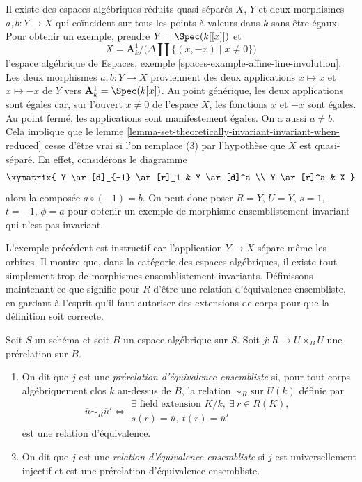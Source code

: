 \begin{example}
\label{example-not-invariant}
Il existe des espaces algébriques réduits quasi-séparés $X$, $Y$ et deux
morphismes $a, b : Y \to X$ qui coïncident sur tous les points à valeurs dans $k$ sans être
égaux. Pour obtenir un exemple, prendre $Y = \Spec(k[[x]])$ et
$$
X = \mathbf{A}^1_k \Big/ \big(\Delta \amalg \{(x, -x) \mid x \not = 0\}\big)
$$
l'espace algébrique de
Espaces, exemple \ref{spaces-example-affine-line-involution}.
Les deux morphismes $a, b : Y \to X$
proviennent des deux applications $x \mapsto x$ et $x \mapsto -x$
de $Y$ vers $\mathbf{A}^1_k = \Spec(k[x])$. Au point générique,
les deux applications sont égales car, sur l'ouvert $x \not = 0$ de l'espace
$X$, les fonctions $x$ et $-x$ sont égales. Au point fermé,
les applications sont manifestement égales. On a aussi $a \not = b$.
Cela implique que le
lemme \ref{lemma-set-theoretically-invariant-invariant-when-reduced}
cesse d'être vrai si l'on remplace (3) par l'hypothèse que $X$
est quasi-séparé. En effet, considérons le diagramme
$$
\xymatrix{
Y \ar[d]_{-1} \ar[r]_1 & Y \ar[d]^a \\
Y \ar[r]^a & X
}
$$
alors la composée $a \circ (-1) = b$. On peut donc poser $R = Y$,
$U = Y$, $s = 1$, $t = -1$, $\phi = a$ pour obtenir un exemple de morphisme
ensemblistement invariant qui n'est pas invariant.
\end{example}

\noindent
L'exemple précédent est instructif car l'application $Y \to X$ sépare même
les orbites. Il montre que, dans la catégorie des espaces algébriques, il existe tout
simplement trop de morphismes ensemblistement invariants. Définissons maintenant
ce que signifie pour $R$ d'être une relation d'équivalence ensembliste, en gardant
à l'esprit qu'il faut autoriser des extensions de corps pour que la définition
soit correcte.

\begin{definition}
\label{definition-set-theoretic-equivalence}
Soit $S$ un schéma et soit $B$ un espace algébrique sur $S$.
Soit $j : R \to U \times_B U$ une prérelation sur $B$.
\begin{enumerate}
\item On dit que $j$ est une {\it prérelation d'équivalence ensembliste} si,
pour tout corps algébriquement clos $k$ au-dessus de $B$, la relation
$\sim_R$ sur $U(k)$ définie par
$$
\overline{u} \sim_R \overline{u}'
\Leftrightarrow
\begin{matrix}
\exists\text{ field extension }K/k, \ \exists\ r \in R(K), \\
s(r) = \overline{u}, \ t(r) = \overline{u}'
\end{matrix}
$$
est une relation d'équivalence.
\item On dit que $j$ est une {\it relation d'équivalence ensembliste}
si $j$ est universellement injectif et est une prérelation d'équivalence
ensembliste.
\end{enumerate}
\end{definition}

